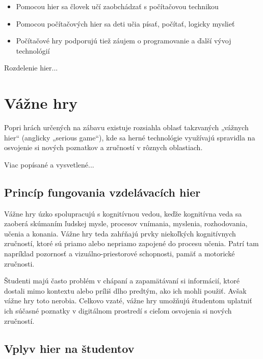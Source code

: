 \documentclass[10pt,twoside,slovak,a4paper]{article}
\begin{document}
\begin{itemize}
\item Pomocou hier sa človek učí zaobchádzať s počítačovou technikou
\item Pomocou počítačových hier sa deti učia písať, počítať, logicky myslieť
\item Počítačové hry podporujú tiež záujem o programovanie a ďalší vývoj technológií
\end{itemize}


\vspace{5mm}

Rozdelenie hier...


\section{Vážne hry} \label{Vazne hry}


Popri hrách určených na zábavu existuje rozsiahla oblasť takzvaných „vážnych hier“ (anglicky „serious game“), kde sa herné technológie využívajú spravidla na osvojenie si nových poznatkov a zručností v rôznych oblastiach.

\vspace{5mm}

Viac popísané a vysvetlené...


\subsection{Princíp fungovania vzdelávacích hier} \label{Fungovanie}



Vážne hry úzko spolupracujú s kognitívnou vedou, keďže kognitívna veda sa zaoberá skúmaním ľudskej mysle, procesov vnímania, myslenia, rozhodovania, učenia a konania. Vážne hry teda zahŕňajú prvky niekoľkých kognitívnych zručností, ktoré sú priamo alebo nepriamo zapojené do procesu učenia. Patrí tam napríklad pozornosť a vizuálno-priestorové schopnosti, pamäť a motorické zručnosti. \cite{Ypsilanti}

\vspace{5mm} %

Študenti majú často problém v chápaní a zapamätávaní si informácií, ktoré dostali mimo kontextu alebo príliš dlho predtým, ako ich mohli použiť. Avšak vážne hry toto nerobia. Celkovo vzaté, vážne hry umožňujú študentom uplatniť ich súčasné poznatky v digitálnom prostredí s cieľom osvojenia si nových zručností. \cite{Gee}


\subsection{Vplyv hier na študentov} \label{Vplyv}
\end{document}

